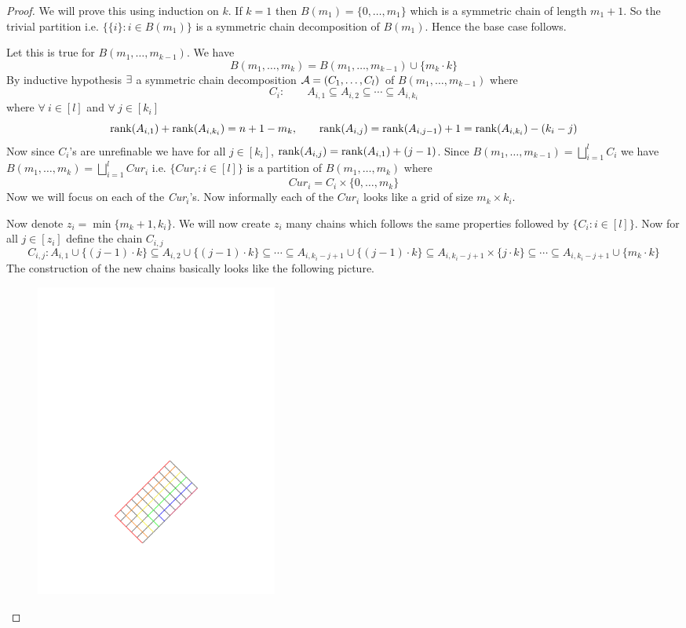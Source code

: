 \begin{proof}
	We will prove this using induction on $k$. If $k=1$ then $B(m_1)=\{0,\dots, m_1\}$ which is a symmetric chain of length $m_1+1$. So the trivial partition i.e. $\{\{i\}\colon i\in B(m_1)\}$ is a symmetric chain decomposition of $B(m_1)$. Hence the base case follows.
	
	Let this is true for $B(m_1,\dots, m_{k-1})$. We have $$B(m_1,\dots, m_{k})=B(m_1,\dots, m_{k-1})\cup\{m_k\cdot k\}$$  By inductive hypothesis $\exists$ a symmetric chain decomposition $\mathcal{A}=(C_1,\dots,C_l)$ of $B(m_1,\dots, m_{k-1})$ where $$C_i:\qquad A_{i,1}\subseteq A_{i,2}\subseteq \cdots\subseteq  A_{i,k_i}$$where $\forall\ i\in[l]$ and $\forall\ j\in[k_i]$ $$\operatorname{rank}(A_{i,1})+\operatorname{rank}(A_{i,k_i})=n+1-m_k,\qquad \operatorname{rank}(A_{i,j})=\operatorname{rank}(A_{i,j-1})+1=\operatorname{rank}(A_{i,k_i})-(k_i-j)$$Now since $C_i$'s are unrefinable we have for all $j\in[k_i]$, $\operatorname{rank}(A_{i,j})=\operatorname{rank}(A_{i,1})+(j-1)$. Since $B(m_1,\dots,m_{k-1})=\bigsqcup\limits_{i=1}^{l}C_i$ we have $B(m_1,\dots, m_k)=\bigsqcup\limits_{i=1}^l\textit{Cur}_i$ i.e. $\{\textit{Cur}_i\colon i\in[l]\}$ is a partition of $B(m_1,\dots,m_k)$ where 
	$$\textit{Cur}_i=C_i\times \{0,\dots, m_k\}$$Now we will focus on each of the \textit{Cur}$_i$'s. Now informally each of the $\textit{Cur}_i$ looks like a grid of size $m_k\times k_i$. 
	
	Now denote $z_i=\min\{m_k+1,k_i\}$. We will now create $z_i$ many chains which follows the same properties followed by $\{C_i\colon i\in[l]\}$. Now for all $j\in [z_i]$ define the chain $C_{i,j}$ 
	$$C_{i,j}\colon  A_{i,1}\cup\{(j-1)\cdot k\}\subseteq  A_{i,2}\cup\{(j-1)\cdot k\}\subseteq  \cdots\subseteq  A_{i,k_i-j+1}\cup\{(j-1)\cdot k\}\subseteq   A_{i,k_i-j+1}\times\{j\cdot k\}\subseteq  \cdots \subseteq  A_{i,k_i-j+1}\cup\{m_k\cdot k\}$$
	The construction of the new chains basically looks like the following picture.
	\begin{figure}[h]
		\centering
		\includegraphics[width=8cm]{images/symchaindecomp.pdf}
	\end{figure}\parinf


\end{proof}
